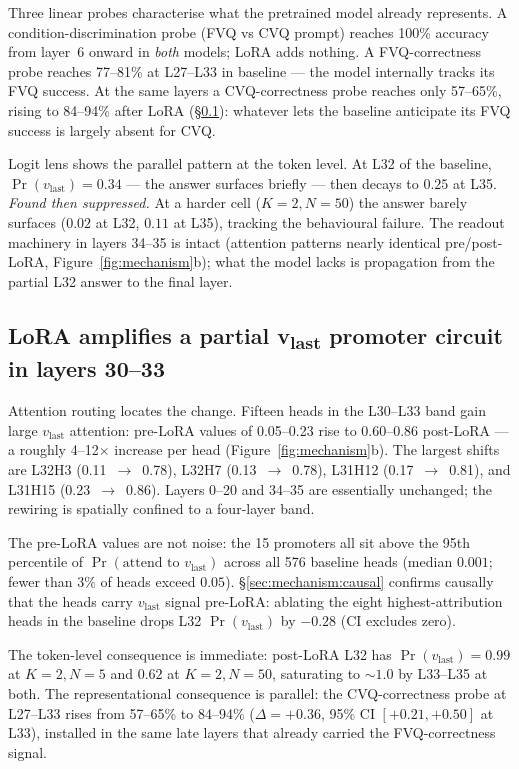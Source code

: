 \documentclass[letterpaper]{article} %
\begin{document}
Three linear probes characterise what the pretrained model already
represents. A condition-discrimination probe (FVQ vs CVQ prompt)
reaches 100\% accuracy from layer~6 onward in \emph{both} models;
LoRA adds nothing. A FVQ-correctness probe reaches 77--81\% at
L27--L33 in baseline --- the model internally tracks its FVQ
success. At the same layers a CVQ-correctness probe reaches only
57--65\%, rising to 84--94\% after LoRA
(\S\ref{sec:mechanism:promoter}): whatever lets the baseline
anticipate its FVQ success is largely absent for CVQ.

Logit lens shows the parallel pattern at the token level. At L32
of the baseline, $\Pr(v_{\text{last}}){=}0.34$ --- the answer
surfaces briefly --- then decays to $0.25$ at L35.
\emph{Found then suppressed.} At a harder cell ($K{=}2, N{=}50$)
the answer barely surfaces ($0.02$ at L32, $0.11$ at L35),
tracking the behavioural failure. The readout machinery in layers
34--35 is intact (attention patterns nearly identical pre/post-LoRA,
Figure~\ref{fig:mechanism}b); what the model lacks is propagation
from the partial L32 answer to the final layer.

\subsection{LoRA amplifies a partial v\textsubscript{last} promoter
circuit in layers 30--33}
\label{sec:mechanism:promoter}

Attention routing locates the change. Fifteen heads in the
L30--L33 band gain large $v_{\text{last}}$ attention:
pre-LoRA values of 0.05--0.23 rise to 0.60--0.86 post-LoRA --- a
roughly 4--12$\times$ increase per head
(Figure~\ref{fig:mechanism}b). The
largest shifts are L32H3 (0.11~$\to$~0.78), L32H7
(0.13~$\to$~0.78), L31H12 (0.17~$\to$~0.81), and L31H15
(0.23~$\to$~0.86). Layers 0--20 and 34--35 are essentially
unchanged; the rewiring is spatially confined to a four-layer band.

The pre-LoRA values are not noise: the 15 promoters all sit above
the 95th percentile of $\Pr(\text{attend to }v_{\text{last}})$
across all 576 baseline heads (median $0.001$; fewer than $3\%$ of
heads exceed $0.05$).
\S\ref{sec:mechanism:causal} confirms causally that the heads
carry $v_{\text{last}}$ signal pre-LoRA: ablating the eight
highest-attribution heads in the baseline drops L32
$\Pr(v_{\text{last}})$ by $-0.28$ (CI excludes zero).

The token-level consequence is immediate: post-LoRA L32 has
$\Pr(v_{\text{last}}) {=} 0.99$ at $K{=}2, N{=}5$ and $0.62$ at
$K{=}2, N{=}50$, saturating to $\sim 1.0$ by L33--L35 at both.
The representational consequence is parallel: the CVQ-correctness
probe at L27--L33 rises from 57--65\% to 84--94\% ($\Delta
{=} {+}0.36$, 95\% CI $[+0.21, +0.50]$ at L33), installed in the
same late layers that already carried the FVQ-correctness signal.
\end{document}
